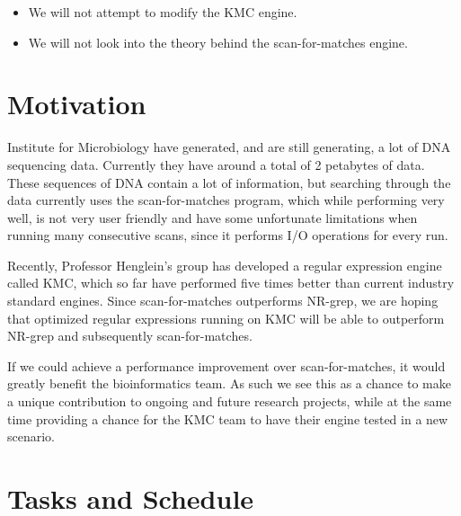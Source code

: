 \documentclass[12pt]{article}
\begin{document}
\begin{itemize}
	\item We will not attempt to modify the KMC engine.
	\item We will not look into the theory behind the scan-for-matches engine.
\end{itemize}

\newpage

\section{Motivation}

Institute for Microbiology have generated, and are still generating, a lot of DNA sequencing data. Currently they have around a total of 2 petabytes of data. These sequences of DNA contain a lot of information, but searching through the data currently uses the scan-for-matches program, which while performing very well, is not very user friendly and have some unfortunate limitations when running many consecutive scans, since it performs I/O operations for every run.

Recently, Professor Henglein's group has developed a regular expression engine called KMC, which so far have performed five times better than current industry standard engines. Since scan-for-matches outperforms NR-grep\cite{nrgrep}, we are hoping that optimized regular expressions running on KMC will be able to outperform NR-grep and subsequently scan-for-matches.

If we could achieve a performance improvement over scan-for-matches, it would greatly benefit the bioinformatics team. As such we see this as a chance to make a unique contribution to ongoing and future research projects, while at the same time providing a chance for the KMC team to have their engine tested in a new scenario.

\newpage

\section{Tasks and Schedule}
\end{document}
